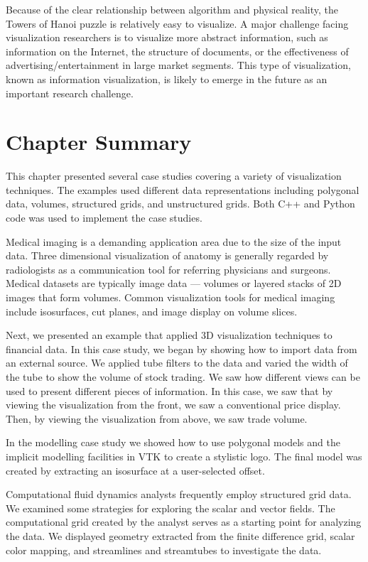 \noindent Because of the clear relationship between algorithm and physical reality, the Towers of Hanoi puzzle is relatively easy to visualize. A major challenge facing visualization researchers is to visualize more abstract information, such as information on the Internet, the structure of documents, or the effectiveness of advertising/entertainment in large market segments. This type of visualization, known as information visualization, is likely to emerge in the future as an important research challenge.

\section{Chapter Summary}

This chapter presented several case studies covering a variety of visualization techniques. The examples used different data representations including polygonal data, volumes, structured grids, and unstructured grids. Both C++ and Python code was used to implement the case studies.

Medical imaging is a demanding application area due to the size of the input data. Three dimensional visualization of anatomy is generally regarded by radiologists as a communication tool for referring physicians and surgeons. Medical datasets are typically
image data --- volumes or layered stacks of 2D images that form volumes. Common visualization tools for medical imaging include isosurfaces, cut planes, and image display on volume slices.

Next, we presented an example that applied 3D visualization techniques to financial data. In this case study, we began by showing how to import data from an external source. We applied tube filters to the data and varied the width of the tube to show the volume of stock trading. We saw how different views can be used to present different pieces of information. In this case, we saw that by viewing the visualization from the front, we saw a conventional price display. Then, by viewing the visualization from above, we saw trade volume.

In the modelling case study we showed how to use polygonal models and the implicit modelling facilities in VTK to create a stylistic logo. The final model was created by extracting an isosurface at a user-selected offset.

Computational fluid dynamics analysts frequently employ structured grid data. We examined some strategies for exploring the scalar and vector fields. The computational grid created by the analyst serves as a starting point for analyzing the data. We displayed geometry extracted from the finite difference grid, scalar color mapping, and streamlines and streamtubes to investigate the data.

